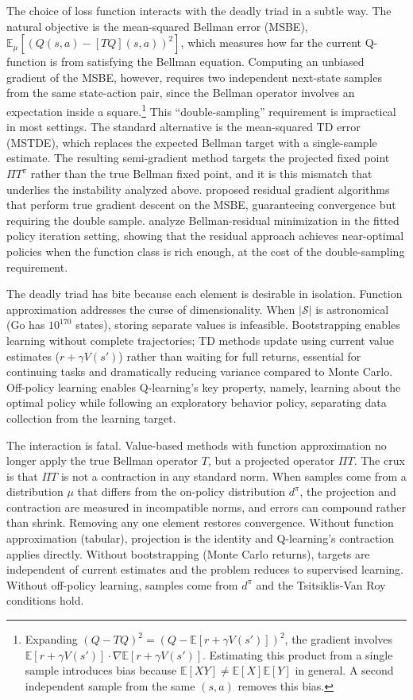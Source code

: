 The choice of loss function interacts with the deadly triad in a subtle way. The natural objective is the mean-squared Bellman error (MSBE), $\mathbb{E}_\mu[(Q(s,a) - [TQ](s,a))^2]$, which measures how far the current Q-function is from satisfying the Bellman equation. Computing an unbiased gradient of the MSBE, however, requires two independent next-state samples from the same state-action pair, since the Bellman operator involves an expectation inside a square.\footnote{Expanding $(Q - TQ)^2 = (Q - \mathbb{E}[r + \gamma V(s')])^2$, the gradient involves $\mathbb{E}[r + \gamma V(s')] \cdot \nabla\mathbb{E}[r + \gamma V(s')]$. Estimating this product from a single sample introduces bias because $\mathbb{E}[XY] \neq \mathbb{E}[X]\mathbb{E}[Y]$ in general. A second independent sample from the same $(s,a)$ removes this bias.} This ``double-sampling'' requirement is impractical in most settings. The standard alternative is the mean-squared TD error (MSTDE), which replaces the expected Bellman target with a single-sample estimate. The resulting semi-gradient method targets the projected fixed point $\Pi T^\pi$ rather than the true Bellman fixed point, and it is this mismatch that underlies the instability analyzed above. \citet{Baird1995} proposed residual gradient algorithms that perform true gradient descent on the MSBE, guaranteeing convergence but requiring the double sample. \citet{Antos2008} analyze Bellman-residual minimization in the fitted policy iteration setting, showing that the residual approach achieves near-optimal policies when the function class is rich enough, at the cost of the double-sampling requirement.

The deadly triad has bite because each element is desirable in isolation. Function approximation addresses the curse of dimensionality. When $|\mathcal{S}|$ is astronomical (Go has $10^{170}$ states), storing separate values is infeasible. Bootstrapping enables learning without complete trajectories; TD methods update using current value estimates ($r + \gamma V(s')$) rather than waiting for full returns, essential for continuing tasks and dramatically reducing variance compared to Monte Carlo. Off-policy learning enables Q-learning's key property, namely, learning about the optimal policy while following an exploratory behavior policy, separating data collection from the learning target.

The interaction is fatal. Value-based methods with function approximation no longer apply the true Bellman operator $T$, but a projected operator $\Pi T$. The crux is that $\Pi T$ is not a contraction in any standard norm. When samples come from a distribution $\mu$ that differs from the on-policy distribution $d^\pi$, the projection and contraction are measured in incompatible norms, and errors can compound rather than shrink. Removing any one element restores convergence. Without function approximation (tabular), projection is the identity and Q-learning's contraction applies directly. Without bootstrapping (Monte Carlo returns), targets are independent of current estimates and the problem reduces to supervised learning. Without off-policy learning, samples come from $d^\pi$ and the Tsitsiklis-Van Roy conditions hold.

